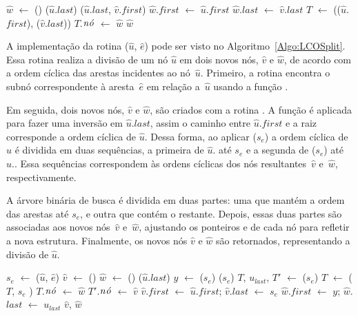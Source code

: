 \begin{algorithm}[htb]
\caption{\LCOMerge($\hat u$, $\hat v$)}
\label{Algo:LCOMerge}
\begin{algorithmic}[1]
\State $\hat w$ $\gets$ \LCOMakeNode()
\State \linkcutEvert($\hat u$.$last$)
\State \linkcutAddEdge($\hat u$.$last$, $\hat v$.$first$)
\State $\hat w$.$first$  $\gets$ $\hat u$.$first$
\State $\hat w$.$last$  $\gets$ $\hat v$.$last$
\State $T$ $\gets$ \treapJoin(\treapGetRoot($\hat u$.$first$), \treapGetRoot($\hat v$.$last$))
\State $T$.$\mathit{n\acute{o}}$ $\gets$ $\hat w$
\State \Return $\hat w$
\end{algorithmic}
\end{algorithm}

A implementação da rotina \LCOSplit($\hat u$, $\hat e$) pode ser visto no Algoritmo~\ref{Algo:LCOSplit}.
Essa rotina realiza a divisão de um nó $\hat u$ em dois novos nós, $\hat v$ e $\hat w$, de acordo com a ordem cíclica das arestas incidentes ao nó~$\hat u$.
Primeiro, a rotina encontra o subnó correspondente à aresta~$\hat e$ em relação a~$\hat u$ usando a função \LCOFindSubNode.

Em seguida, dois novos nós, $\hat v$ e $\hat w$, são criados com a rotina \LCOMakeNode.
A função \linkcutEvert{} é aplicada para fazer uma inversão em $\hat u$.$last$, assim o caminho entre $\hat u$.$first$ e a raiz corresponde a ordem cíclica de $\hat u$.
Dessa forma, ao aplicar \linkcutDelEdge($s_e$) a ordem cíclica de~$\hat u$ é dividida em duas sequências, a primeira de $\hat u$. até $s_e$ e a segunda de \linkcutParent($s_e$) até~$\hat u$..
Essa sequências correspondem às ordens cíclicas dos nós resultantes~$\hat v$ e~$\hat w$, respectivamente.

A árvore binária de busca é dividida em duas partes: uma que mantém a ordem das arestas até $s_e$, e outra que contém o restante.
Depois, essas duas partes são associadas aos novos nós~$\hat v$ e~$\hat w$, ajustando os ponteiros  e  de cada nó para refletir a nova estrutura.
Finalmente, os novos nós $\hat v$ e $\hat w$ são retornados, representando a divisão de $\hat u$.

\begin{algorithm}[htb]
\caption{\LCOSplit($\hat u$, $\hat e$)}
\label{Algo:LCOSplit}
\begin{algorithmic}[1]
\State $s_e$ $\gets$ \LCOFindSubNode($\hat u$, $\hat e$)
\State $\hat v$ $\gets$ \LCOMakeNode()
\State $\hat w$ $\gets$ \LCOMakeNode()
\State \linkcutEvert($\hat u$.$last$)
\State $y$ $\gets$ \linkcutParent($s_e$)
\State \linkcutDelEdge($s_e$)
\State $T$, $u_{last}$, $T'$ $\gets$ \treapSplit($s_e$)
\State $T$ $\gets$ \treapJoin($T$, $s_e$  )
\State $T$.$\mathit{n\acute{o}}$ $\gets$ $\hat w$
\State $T'$.$\mathit{n\acute{o}}$ $\gets$ $\hat v$
\State $\hat v$.$first$ $\gets$ $\hat u$.$first$; $\hat v$.$last$ $\gets$ $s_e$
\State $\hat w$.$first$ $\gets$ $y$; $\hat w$.$last$ $\gets$ $u_{last}$
\State \Return $\hat v$, $\hat w$
\end{algorithmic}
\end{algorithm}


